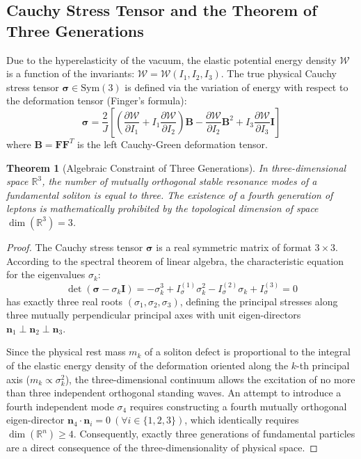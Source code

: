 \documentclass[12pt,a4paper]{article}
\newtheorem{theorem}{Theorem}
\begin{document}
	\subsection{Cauchy Stress Tensor and the Theorem of Three Generations}
	Due to the hyperelasticity of the vacuum, the elastic potential energy density $\mathcal{W}$ is a function of the invariants: $\mathcal{W} = \mathcal{W}(I_1, I_2, I_3)$. The true physical Cauchy stress tensor $\boldsymbol{\sigma} \in \mathrm{Sym}(3)$ is defined via the variation of energy with respect to the deformation tensor (Finger's formula):
	\begin{equation}
		\boldsymbol{\sigma} = \frac{2}{J} \left[ \left( \frac{\partial \mathcal{W}}{\partial I_1} + I_1 \frac{\partial \mathcal{W}}{\partial I_2} \right) \mathbf{B} - \frac{\partial \mathcal{W}}{\partial I_2} \mathbf{B}^2 + I_3 \frac{\partial \mathcal{W}}{\partial I_3} \mathbf{I} \right]
	\end{equation}
	where $\mathbf{B} = \mathbf{F} \mathbf{F}^T$ is the left Cauchy-Green deformation tensor.
	
	\begin{theorem}[Algebraic Constraint of Three Generations]
		In three-dimensional space $\mathbb{R}^3$, the number of mutually orthogonal stable resonance modes of a fundamental soliton is equal to three. The existence of a fourth generation of leptons is mathematically prohibited by the topological dimension of space $\dim(\mathbb{R}^3) = 3$.
	\end{theorem}
	
	\begin{proof}
		The Cauchy stress tensor $\boldsymbol{\sigma}$ is a real symmetric matrix of format $3 \times 3$. According to the spectral theorem of linear algebra, the characteristic equation for the eigenvalues $\sigma_k$:
		\begin{equation}
			\det(\boldsymbol{\sigma} - \sigma_k \mathbf{I}) = -\sigma_k^3 + I_\sigma^{(1)} \sigma_k^2 - I_\sigma^{(2)} \sigma_k + I_\sigma^{(3)} = 0
		\end{equation}
		has exactly three real roots $(\sigma_1, \sigma_2, \sigma_3)$, defining the principal stresses along three mutually perpendicular principal axes with unit eigen-directors $\mathbf{n}_1 \perp \mathbf{n}_2 \perp \mathbf{n}_3$.
		
		Since the physical rest mass $m_k$ of a soliton defect is proportional to the integral of the elastic energy density of the deformation oriented along the $k$-th principal axis ($m_k \propto \sigma_k^2$), the three-dimensional continuum allows the excitation of no more than three independent orthogonal standing waves. An attempt to introduce a fourth independent mode $\sigma_4$ requires constructing a fourth mutually orthogonal eigen-director $\mathbf{n}_4 \cdot \mathbf{n}_i = 0 \ (\forall i \in \{1,2,3\})$, which identically requires $\dim(\mathbb{R}^n) \ge 4$. Consequently, exactly three generations of fundamental particles are a direct consequence of the three-dimensionality of physical space.
	\end{proof}
	
\end{document}
